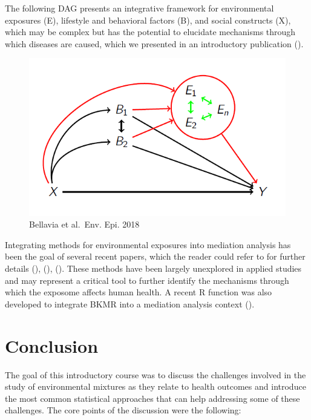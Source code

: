 \documentclass[
]{book}
\begin{document}
The following DAG presents an integrative framework for environmental exposures (E), lifestyle and behavioral factors (B), and social constructs (X), which may be complex but has the potential to elucidate mechanisms through which diseases are caused, which we presented in an introductory publication (\citet{bellavia2018multiple}).

\begin{figure}
\centering
\includegraphics{images/mediation.png}
\caption{Bellavia et al.~Env. Epi. 2018}
\end{figure}

Integrating methods for environmental exposures into mediation analysis has been the goal of several recent papers, which the reader could refer to for further details (\citet{bellavia2019approaches}), (\citet{blum2020challenges}), (\citet{devick2018bayesian}). These methods have been largely unexplored in applied studies and may represent a critical tool to further identify the mechanisms through which the exposome affects human health. A recent R function was also developed to integrate BKMR into a mediation analysis context (\citet{wang2020bkmr}).

\hypertarget{conclusion}{%
\section{Conclusion}\label{conclusion}}

The goal of this introductory course was to discuss the challenges involved in the study of environmental mixtures as they relate to health outcomes and introduce the most common statistical approaches that can help addressing some of these challenges. The core points of the discussion were the following:
\end{document}
